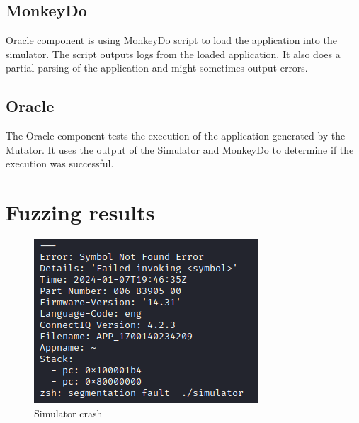 \subsection*{MonkeyDo}
Oracle component is using MonkeyDo script to load the application into the simulator.
The script outputs logs from the loaded application.
It also does a partial parsing of the application and might sometimes output errors.


\subsection*{Oracle}
The Oracle component tests the execution of the application generated by the Mutator.
It uses the output of the Simulator and MonkeyDo to determine if the execution was successful.


\section{Fuzzing results}

\begin{figure}[h]
    \centering
    \includegraphics[width=0.4\linewidth]{../../images/simulator-crash}
    \caption{Simulator crash}
    \label{fig:simulator-crash}
\end{figure}